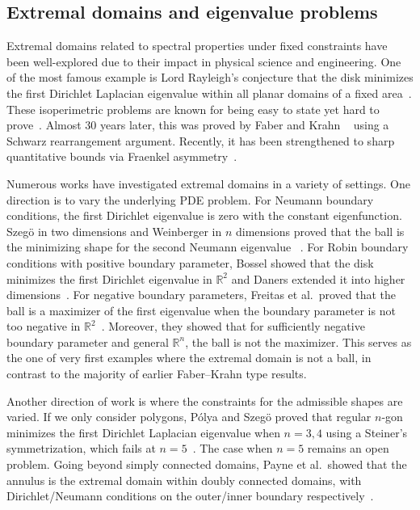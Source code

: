 \documentclass{amsart}
\theoremstyle{plain}
\begin{document}
\subsection{Extremal domains and eigenvalue problems}

Extremal domains related to spectral properties under fixed constraints have been well-explored due to their impact in physical science and engineering.
One of the most famous example is Lord Rayleigh's conjecture that the disk minimizes the first Dirichlet Laplacian eigenvalue within all planar domains of a fixed area~\cites{rayleigh1896theory}.
These isoperimetric problems are known for being easy to state yet hard to prove~\cite{henrot2006extremum}.
Almost $30$ years later, this was proved by Faber and Krahn ~\cite{krahn1925rayleigh} using a Schwarz rearrangement argument.
Recently, it has been strengthened to sharp quantitative bounds via Fraenkel asymmetry~\cites{brasco2015faber,brasco2012sharp}.

Numerous works have investigated extremal domains in a variety of settings.
One direction is to vary the underlying PDE problem.
For Neumann boundary conditions, the first Dirichlet eigenvalue is zero with the constant eigenfunction. 
Szeg{\"o} in two dimensions and Weinberger in $n$ dimensions proved that the ball is the minimizing shape for the second Neumann eigenvalue ~\cites{szego1954inequalities,weinberger1956isoperimetric}.
For Robin boundary conditions with positive boundary parameter, Bossel showed that the disk minimizes the first Dirichlet eigenvalue in $\mathbb{R}^2$ and Daners extended it into higher dimensions~\cites{bossel1986membranes,daners2006faber}.
For negative boundary parameters, Freitas et al.\ proved that the ball is a maximizer of the first eigenvalue when the boundary parameter is not too negative in $\mathbb{R}^2$~\cite{freitas2015first}.
Moreover, they showed that for sufficiently negative boundary parameter and general $\mathbb{R}^n$, the ball is not the maximizer.
This serves as the one of very first examples where the extremal domain is not a ball, in contrast to the majority of earlier Faber--Krahn type results.

Another direction of work is where the constraints for the admissible shapes are varied.
If we only consider polygons, P{\'o}lya and Szeg{\"o} proved that regular $n$-gon minimizes the first Dirichlet Laplacian eigenvalue when $n=3,4$ using a Steiner's symmetrization, which fails at $n=5$~\cite{polya2016isoperimetric}.
The case when $n=5$ remains an open problem.
Going beyond simply connected domains, Payne et al.\ showed that the annulus is the extremal domain within doubly connected domains, with Dirichlet/Neumann conditions on the outer/inner boundary respectively~\cite{payne1961some}.
\end{document}
